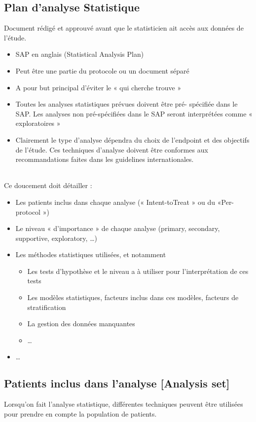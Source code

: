 \subsection{Plan d’analyse Statistique}

Document rédigé et approuvé avant que le statisticien ait accès aux données de l’étude.\\

\begin{itemize}
    \item SAP en anglais (Statistical Analysis Plan)
    \item Peut être une partie du protocole ou un document séparé
    \item A pour but principal d’éviter le « qui cherche trouve » 
     \item Toutes les analyses statistiques prévues doivent être pré- spécifiée dans le SAP. Les analyses non pré-spécifiées dans le SAP seront interprétées comme « exploratoires »
    \item Clairement le type d’analyse dépendra du choix de l’endpoint et des objectifs de l’étude. Ces techniques d’analyse doivent être conformes aux recommandations faites dans les guidelines internationales.
\end{itemize}\\

Ce doucement doit détailler :

\begin{itemize}
    \item Les patients inclus dans chaque analyse (« Intent-toTreat » ou du
«Per-protocol »)
\item Le niveau « d’importance » de chaque analyse (primary,
secondary, supportive, exploratory, …)
\item Les méthodes statistiques utilisées, et notamment
\begin{itemize}
    \item  Les tests d’hypothèse et le niveau a à utiliser pour
l’interprétation de ces tests
\item Les modèles statistiques, facteurs inclus dans ces modèles,
facteurs de stratification
\item La gestion des données manquantes
\item …
\end{itemize}
\item …
\end{itemize}

\subsection{Patients inclus dans l’analyse [Analysis set]}
Lorsqu'on fait l'analyse statistique, différentes techniques peuvent être utilisées pour prendre en compte la population de patients.\\

